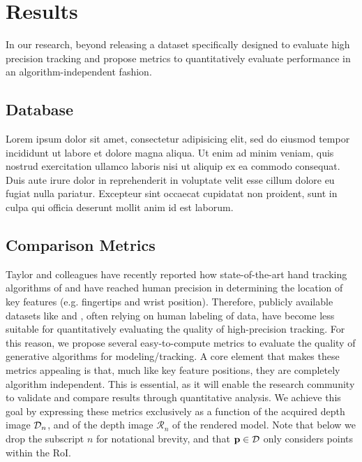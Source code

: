 \section{Results}
\label{sec:results}


In our research, beyond releasing a dataset specifically designed to evaluate high precision tracking and propose metrics to quantitatively evaluate  performance in an algorithm-independent fashion.

\subsection{Database}
\begin{DRAFT}
Lorem ipsum dolor sit amet, consectetur adipisicing elit, sed do eiusmod tempor incididunt ut labore et dolore magna aliqua. Ut enim ad minim veniam, quis nostrud exercitation ullamco laboris nisi ut aliquip ex ea commodo consequat. Duis aute irure dolor in reprehenderit in voluptate velit esse cillum dolore eu fugiat nulla pariatur. Excepteur sint occaecat cupidatat non proident, sunt in culpa qui officia deserunt mollit anim id est laborum.
\end{DRAFT}

\providecommand{\depthrend}{\mathcal{R}}
\providecommand{\metricone}{E_\text{3D}}
\providecommand{\metrictwo}{E_\text{2D}}
\subsection{Comparison Metrics}
Taylor and colleagues  have recently reported how state-of-the-art hand tracking algorithms of \cite{sharp2015accurate} and \cite{tagliasacchi2015robust} have reached human precision in determining the location of key features (e.g. fingertips and wrist position). Therefore, publicly available datasets like \cite{tompson2014real} and \cite{sridhar2013multicam}, often relying on human labeling of data, have become less suitable for quantitatively evaluating the quality of high-precision tracking. 
% 
For this reason, we propose several easy-to-compute metrics to evaluate the quality of generative algorithms for modeling/tracking. A core element that makes these metrics appealing is that, much like key feature positions, they are completely algorithm independent. This is essential, as it will enable the research community to validate and compare results through quantitative analysis. 
% 
We achieve this goal by expressing these metrics exclusively as a function of the acquired depth image $\mathcal{D}_n$, and of the depth image $\depthrend_{n}$ of the rendered model. Note that below we drop the subscript $n$ for notational brevity, and that $\mathbf{p} \in \mathcal{D}$ only considers points within the RoI. 


